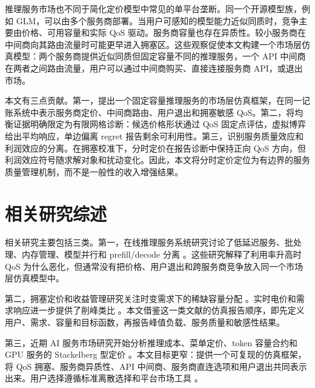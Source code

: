 \documentclass[UTF8,11pt,a4paper]{ctexart}
\begin{document}
推理服务市场也不同于简化定价模型中常见的单平台垄断。同一个开源模型族，例如 GLM，可以由多个服务商部署。当用户可感知的模型能力近似同质时，竞争主要由价格、可用容量和实际 QoS 驱动。服务商容量也存在异质性。较小服务商在中间商向其路由流量时可能更早进入拥塞区。这些观察促使本文构建一个市场层仿真模型：两个服务商提供近似同质但固定容量不同的推理服务，一个 API 中间商在两者之间路由流量，用户可以通过中间商购买、直接连接服务商 API，或退出市场。

本文有三点贡献。第一，提出一个固定容量推理服务的市场层仿真框架，在同一记账系统中表示服务商定价、中间商路由、用户退出和拥塞敏感 QoS。第二，将均衡证据明确限定为有限网格诊断：候选价格形状通过 QoS 固定点评估，虚拟博弈给出平均响应，单边偏离 regret 报告剩余可利用性。第三，识别服务质量效应和利润效应的分离。在拥塞校准下，分时定价在报告诊断中保持正向 QoS 方向，但利润效应符号随求解对象和扰动变化。因此，本文将分时定价定位为有边界的服务质量管理机制，而不是一般性的收入增强结果。

\section{相关研究综述}
\label{sec:related}

相关研究主要包括三类。第一，在线推理服务系统研究讨论了低延迟服务、批处理、内存管理、模型并行和 prefill/decode 分离 \cite{crankshaw2017clipper,gujarati2020clockwork,romero2021infaas,yu2022orca,li2023alpaserve,sheng2023flexgen,kwon2023pagedattention,agrawal2024sarathiserve,patel2024splitwise,zhong2024distserve,agrawal2024vidur}。这些研究解释了利用率升高时 QoS 为什么恶化，但通常没有把价格、用户退出和跨服务商竞争放入同一个市场层仿真模型中。

第二，拥塞定价和收益管理研究关注时变需求下的稀缺容量分配 \cite{vickrey1969congestion,arnott1990bottleneck,gallego1994dynamic,elmaghraby2003dynamic,bitran2003overview,talluri2004revenue,phillips2005pricing}。实时电价和需求响应进一步提供了削峰类比 \cite{schweppe1988spot,borenstein2005long,allcott2011rethinking,siano2014demand}。本文借鉴这一类文献的仿真报告顺序，即先定义用户、需求、容量和目标函数，再报告峰值负载、服务质量和敏感性结果。

第三，近期 AI 服务市场研究开始分析推理成本、菜单定价、token 容量合约和 GPU 服务的 Stackelberg 型定价 \cite{demirer2025emerging,erdil2025inference,bergemann2025menu,guo2026prillm,yan2026stackelberg,cunningham2026token,liu2026locational}。本文目标更窄：提供一个可复现的仿真框架，将 QoS 拥塞、服务商异质性、API 中间商、服务商直连选项和用户退出共同表示出来。用户选择遵循标准离散选择和平台市场工具 \cite{mcfadden1974conditional,anderson1992discrete,train2009discrete,rochet2003platform}。
\end{document}
